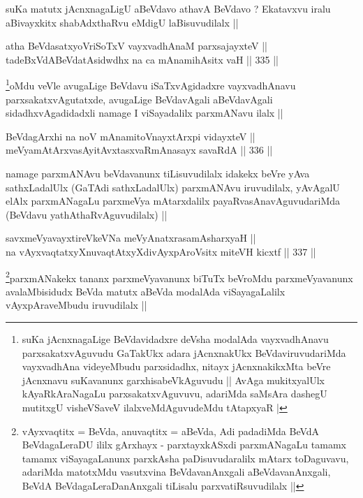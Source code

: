 \begin{artha}
suKa matutx jAcnxnagaLigU aBeVdavo athavA BeVdavo ? Ekatavxvu iralu
aBivayxkitx shabAdxthaRvu eMdigU laBisuvudilalx ||
\end{artha}

\begin{shl}
atha BeVdasatxyoVriSoTxV vayxvadhAnaM parxsajayxteV || \\
tadeBxVdABeVdatAsidwdhx na ca mAnamihAsitx vaH ||  335 ||  
\end{shl}

\begin{artha}
\footnote{suKa jAcnxnagaLige BeVdavidadxre deVsha modalAda
  vayxvadhAnavu parxsakatxvAguvudu GaTakUkx adara jAcnxnakUkx
  BeVdaviruvudariMda vayxvadhAna videyeMbudu parxsidadhx, nitayx
  jAcnxnakikxMta beVre jAcnxnavu suKavanunx garxhisabeVkAguvudu ||
  AvAga mukitxyalUlx kAyaRkAraNagaLu parxsakatxvAguvuvu, adariMda
  saMsAra dashegU mutitxgU visheVSaveV ilalxveMdAguvudeMdu tAtapxyaR |}oMdu veVle avugaLige BeVdavu iSaTxvAgidadxre vayxvadhAnavu
parxsakatxvAgutatxde, avugaLige BeVdavAgali aBeVdavAgali
sidadhxvAgadidadxli namage I viSayadalilx parxmANavu ilalx ||
\end{artha}

\begin{shl}
BeVdagArxhi na noV mAnamitoV\s nayxtArxpi vidayxteV || \\
meVyamAtArxvasAyitAvxtasxvaRmAnasayx savaRdA ||  336 ||  
\end{shl}

\begin{artha}
namage parxmANAvu beVdavanunx tiLisuvudilalx idakekx beVre yAva
sathxLadalUlx (GaTAdi sathxLadalUlx) parxmANAvu iruvudilalx, yAvAgalU
elAlx parxmANagaLu parxmeVya mAtarxdalilx payaRvasAnavAguvudariMda
(BeVdavu yathAthaRvAguvudilalx) ||
\end{artha}

\begin{shl}
savxmeVyavayxtireVkeVNa meVyAnatxrasamAsharxyaH || \\
na vAyxvaqtatxyXnuvaqtAtxyXdivAyxpAroV\s sitx miteVH kicxtf ||  337 ||  
\end{shl}

\begin{artha}
\footnote{vAyxvaqtitx = BeVda, anuvaqtitx = aBeVda, Adi padadiMda
  BeVdA BeVdagaLeraDU ililx gArxhayx - parxtayxkASxdi parxmANagaLu
  tamamx tamamx viSayagaLanunx parxkAsha paDisuvudaralilx mAtarx
  toDaguvavu, adariMda matotxMdu vasutxvina BeVdavanAnxgali
  aBeVdavanAnxgali, BeVdA BeVdagaLeraDanAnxgali tiLisalu
  parxvatiRsuvudilalx ||}parxmANakekx tananx parxmeVyavanunx biTuTx beVroMdu
parxmeVyavanunx avalaMbisidudx BeVda matutx aBeVda modalAda
viSayagaLalilx vAyxpAraveMbudu iruvudilalx ||
\end{artha}

